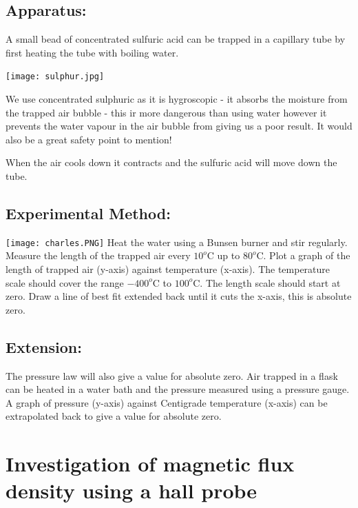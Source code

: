 \subsection{Apparatus:}

A small bead of concentrated sulfuric acid can be trapped in a capillary tube by first heating the tube with boiling water.\begin{marginfigure}
	\texttt{[image: sulphur.jpg]}
	\caption{We use concentrated sulphuric as it is hygroscopic - it absorbs the moisture from the trapped air bubble - this ir more dangerous than using water however it prevents the water vapour in the air bubble from giving us a poor result. It would also be a great safety point to mention!}
\end{marginfigure} When the air cools down it contracts and the sulfuric acid will move down the tube.

\subsection{Experimental Method:}
\texttt{[image: charles.PNG]}
Heat the water using a Bunsen burner and stir regularly. Measure the length of the trapped air every \(10^o\)C up to \(80^o\)C. Plot a graph of the length of trapped air (y-axis) against temperature (x-axis). The temperature scale should cover the range \(-400^o\)C to
\(100^o\)C. The length scale should start at zero. Draw a line of best fit extended back until it cuts the x-axis, this is absolute zero.
\subsection{Extension:}
The pressure law will also give a value for absolute zero. Air trapped in a flask can be heated in a water bath and the pressure measured using a pressure gauge. A graph of pressure (y-axis) against Centigrade temperature (x-axis) can be extrapolated back to give a value for absolute zero.

\section{Investigation of magnetic flux density using a hall probe}
